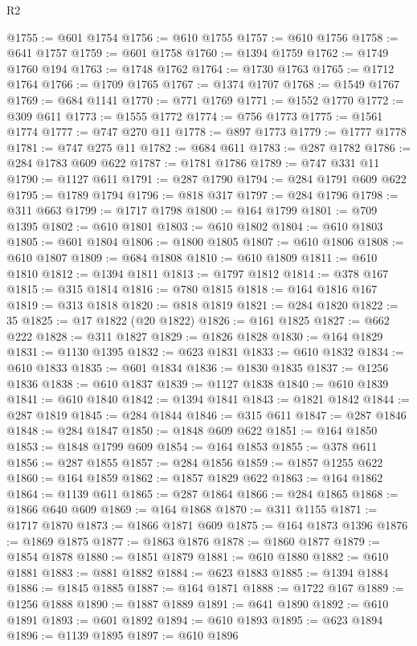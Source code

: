 \begin{lexlean}{R2}
\begin{coremodule}
@1755 := @601 @1754
@1756 := @610 @1755
@1757 := @610 @1756
@1758 := @641 @1757
@1759 := @601 @1758
@1760 := @1394 @1759
@1762 := @1749 @1760 @194
@1763 := @1748 @1762
@1764 := @1730 @1763
@1765 := @1712 @1764
@1766 := @1709 @1765
@1767 := @1374 @1707
@1768 := @1549 @1767
@1769 := @684 @1141
@1770 := @771 @1769
@1771 := @1552 @1770
@1772 := @309 @611
@1773 := @1555 @1772
@1774 := @756 @1773
@1775 := @1561 @1774
@1777 := @747 @270 @11
@1778 := @897 @1773
@1779 := @1777 @1778
@1781 := @747 @275 @11
@1782 := @684 @611
@1783 := @287 @1782
@1786 := @284 @1783 @609 @622
@1787 := @1781 @1786
@1789 := @747 @331 @11
@1790 := @1127 @611
@1791 := @287 @1790
@1794 := @284 @1791 @609 @622
@1795 := @1789 @1794
@1796 := @818 @317
@1797 := @284 @1796
@1798 := @311 @663
@1799 := @1717 @1798
@1800 := @164 @1799
@1801 := @709 @1395
@1802 := @610 @1801
@1803 := @610 @1802
@1804 := @610 @1803
@1805 := @601 @1804
@1806 := @1800 @1805
@1807 := @610 @1806
@1808 := @610 @1807
@1809 := @684 @1808
@1810 := @610 @1809
@1811 := @610 @1810
@1812 := @1394 @1811
@1813 := @1797 @1812
@1814 := @378 @167
@1815 := @315 @1814
@1816 := @780 @1815
@1818 := @164 @1816 @167
@1819 := @313 @1818
@1820 := @818 @1819
@1821 := @284 @1820
@1822 := 35
@1825 := @17 @1822 (@20 @1822)
@1826 := @161 @1825
@1827 := @662 @222
@1828 := @311 @1827
@1829 := @1826 @1828
@1830 := @164 @1829
@1831 := @1130 @1395
@1832 := @623 @1831
@1833 := @610 @1832
@1834 := @610 @1833
@1835 := @601 @1834
@1836 := @1830 @1835
@1837 := @1256 @1836
@1838 := @610 @1837
@1839 := @1127 @1838
@1840 := @610 @1839
@1841 := @610 @1840
@1842 := @1394 @1841
@1843 := @1821 @1842
@1844 := @287 @1819
@1845 := @284 @1844
@1846 := @315 @611
@1847 := @287 @1846
@1848 := @284 @1847
@1850 := @1848 @609 @622
@1851 := @164 @1850
@1853 := @1848 @1799 @609
@1854 := @164 @1853
@1855 := @378 @611
@1856 := @287 @1855
@1857 := @284 @1856
@1859 := @1857 @1255 @622
@1860 := @164 @1859
@1862 := @1857 @1829 @622
@1863 := @164 @1862
@1864 := @1139 @611
@1865 := @287 @1864
@1866 := @284 @1865
@1868 := @1866 @640 @609
@1869 := @164 @1868
@1870 := @311 @1155
@1871 := @1717 @1870
@1873 := @1866 @1871 @609
@1875 := @164 @1873 @1396
@1876 := @1869 @1875
@1877 := @1863 @1876
@1878 := @1860 @1877
@1879 := @1854 @1878
@1880 := @1851 @1879
@1881 := @610 @1880
@1882 := @610 @1881
@1883 := @881 @1882
@1884 := @623 @1883
@1885 := @1394 @1884
@1886 := @1845 @1885
@1887 := @164 @1871
@1888 := @1722 @167
@1889 := @1256 @1888
@1890 := @1887 @1889
@1891 := @641 @1890
@1892 := @610 @1891
@1893 := @601 @1892
@1894 := @610 @1893
@1895 := @623 @1894
@1896 := @1139 @1895
@1897 := @610 @1896

\end{coremodule}
\end{lexlean}

